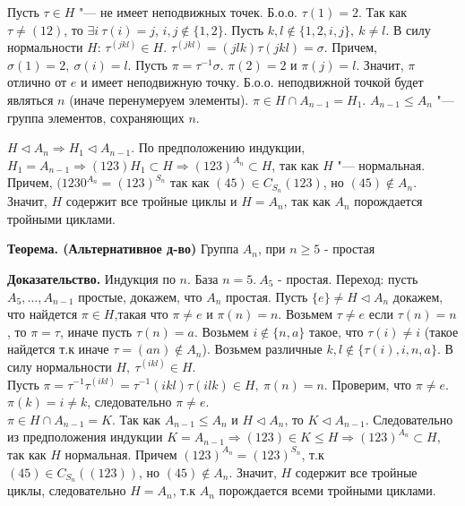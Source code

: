 \documentclass{article}
\begin{document}
Пусть $\tau \in H$ "--- не имеет неподвижных точек. Б.о.о. $\tau(1) = 2$. Так как $\tau \neq (1 2)$, то $\exists i \  \tau(i) = j$, $i, j \notin \{1, 2\}$. Пусть $k, l \notin \{1, 2, i, j\}, \  k \neq l$. В силу нормальности $H$: $\tau^{(j k l)} \in H$. $\tau^{(j k l)} = (j l k)\tau(j k l) = \sigma$. Причем, $\sigma(1) = 2, \  \sigma(i) = l$. Пусть $\pi= \tau^{-1}\sigma$. $\pi(2) = 2$ и $\pi(j) = l$. Значит, $\pi$ отлично от $e$ и имеет неподвижную точку. Б.о.о. неподвижной точкой будет являться $n$ (иначе перенумеруем элементы). $\pi \in H \cap A_{n-1} = H_1$. $A_{n-1} \leq A_n$ "--- группа элементов, сохраняющих $n$.

$H \triangleleft A_n \Rightarrow H_1 \triangleleft A_{n-1}$. По предположению индукции, $H_1 = A_{n-1} \Rightarrow (1 2 3)H_1 \subset H \Rightarrow (1 2 3)^{A_n} \subset H$, так как $H$ "--- нормальная. Причем, $(1 2 30^{A_n} = (1 2 3)^{S_n}$ так как $(4 5) \in C_{S_n}(1 2 3)$, но $(4 5) \notin A_n$. Значит, $H$ содержит все тройные циклы и $H = A_n$, так как $A_n$ порождается тройными циклами.

\vspace{10pt}

\textbf{Теорема. (Альтернативное д-во)} Группа $A_n$, при $n \ge 5$ - простая
 
\textbf{Доказательство.}
Индукция по $n$. База $n=5.\ A_5$ - простая. Переход: пусть $A_5,\ldots,A_{n-1}$ простые, докажем, что $A_n$ простая. Пусть $\{e\}\neq H \triangleleft A_n$ докажем, что найдется $\pi\in H$,такая что $\pi\neq e$ и $\pi(n)= n$. Возьмем $\tau\neq e$ если $\tau(n)=n$, то $\pi=\tau$, иначе пусть $\tau(n)=a$. Возьмем $i\notin\{n,a\}$ такое, что $\tau(i)\neq i$ (такое найдется т.к иначе $\tau=(an)\notin A_n$). Возьмем различные $k,l\notin\{\tau(i),i,n,a\}$. В силу нормальности $H,\ \tau^{(ikl)}\in H$. \\Пусть
$\pi=\tau^{-1}\tau^{(ikl)}=\tau^{-1}(ikl)\tau(ilk)\in H,\ \pi(n)=n$.
Проверим, что $\pi\neq e$. $\pi(k)=i\neq k$, следовательно $\pi\neq e$.\\
$\pi\in H\cap A_{n-1} = K$. Так как $A_{n-1}\le A_n$ и $H \triangleleft A_n$, то $K \triangleleft A_{n-1}$. Следовательно из предположения индукции $K=A_{n-1} \Rightarrow (123)\in K \le H \Rightarrow (123)^{A_n} \subset H$, так как $H$ нормальная. Причем $(123)^{A_n}=(123)^{S_n}$, т.к $(45)\in C_{S_n}((123))$, но $(45)\notin A_n$. Значит, $H$ содержит все тройные циклы, следовательно $H = A_n$, т.к $A_n$ порождается всеми тройными циклами.

\vspace{10pt}
\end{document}
